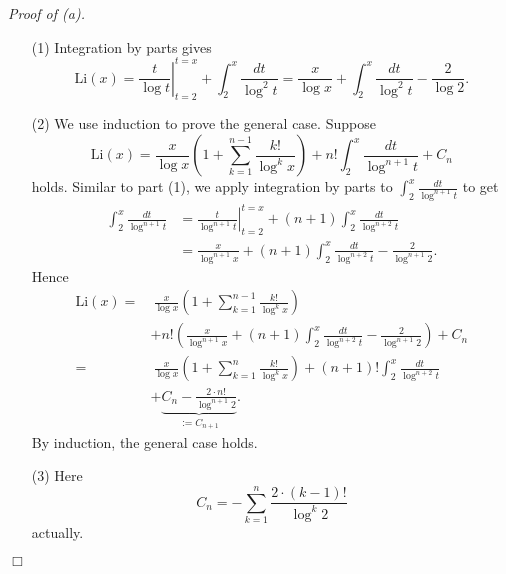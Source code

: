 \documentclass{article}
\begin{document}
\emph{Proof of (a).}
\begin{enumerate}
\item[(1)]
  Integration by parts gives
  \[
    \mathrm{Li}(x)
    = \left.\frac{t}{\log t}\right|_{t=2}^{t=x} + \int_{2}^{x} \frac{dt}{\log^{2}t}
    = \frac{x}{\log x} + \int_{2}^{x} \frac{dt}{\log^{2}t} - \frac{2}{\log 2}.
  \]

\item[(2)]
  We use induction to prove the general case.
  Suppose
  \[
    \mathrm{Li}(x)
    = \frac{x}{\log x}\left(1 + \sum_{k=1}^{n-1} \frac{k!}{\log^{k}x} \right)
        + n! \int_{2}^{x} \frac{dt}{\log^{n+1} t} + C_n
  \]
  holds.
  Similar to part (1),
  we apply integration by parts to $\int_{2}^{x} \frac{dt}{\log^{n+1}t}$ to get
  \begin{align*}
    \int_{2}^{x} \frac{dt}{\log^{n+1}t}
    &= \left.\frac{t}{\log^{n+1} t}\right|_{t=2}^{t=x}
        + (n+1) \int_{2}^{x} \frac{dt}{\log^{n+2}t} \\
    &= \frac{x}{\log^{n+1} x}
        + (n+1) \int_{2}^{x} \frac{dt}{\log^{n+2}t} - \frac{2}{\log^{n+1} 2}.
  \end{align*}
  Hence
  \begin{align*}
    \mathrm{Li}(x)
    =&\: \frac{x}{\log x}\left(1 + \sum_{k=1}^{n-1} \frac{k!}{\log^{k}x} \right) \\
        &+ n! \left( \frac{x}{\log^{n+1} x} + (n+1)\int_{2}^{x} \frac{dt}{\log^{n+2}t}
            - \frac{2}{\log^{n+1} 2} \right) + C_n \\
    =&\: \frac{x}{\log x}\left(1 + \sum_{k=1}^{n} \frac{k!}{\log^{k}x} \right) 
        + (n+1)!\int_{2}^{x} \frac{dt}{\log^{n+2}t} \\
        & + \underbrace{C_n - \frac{2 \cdot n!}{\log^{n+1} 2}}_{:= C_{n+1}}.
  \end{align*}
  By induction, the general case holds.

\item[(3)]
  Here
  \[
    C_n = - \sum_{k=1}^{n} \frac{2 \cdot (k-1)!}{\log^{k} 2}
  \]
  actually.
\end{enumerate}
$\Box$ \\
\end{document}
